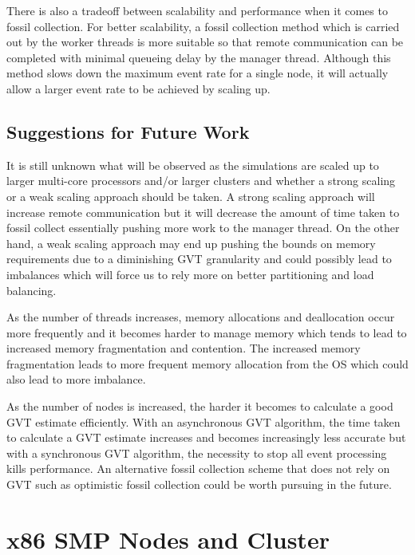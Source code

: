 \documentclass[11pt]{book}
\begin{document}
There is also a tradeoff between scalability and performance when it comes to fossil collection.
For better scalability, a fossil collection method which is carried out by the worker threads is
more suitable so that remote communication can be completed with minimal queueing delay by the
manager thread.  Although this method slows down the maximum event rate for a single node, it will
actually allow a larger event rate to be achieved by scaling up.

\section{Suggestions for Future Work}

It is still unknown what will be observed as the simulations are scaled up to larger
multi-core processors and/or larger clusters and whether a strong scaling or a weak scaling
approach should be taken.  A strong scaling approach will increase remote communication but
it will decrease the amount of time taken to fossil collect essentially pushing more work to
the manager thread.  On the other hand, a weak scaling approach may end up pushing the bounds
on memory requirements due to a diminishing GVT granularity and could possibly lead to imbalances
which will force us to rely more on better partitioning and load balancing.

As the number of threads increases, memory allocations and deallocation occur more frequently
and it becomes harder to manage memory which tends to lead to increased memory fragmentation
and contention.  The increased memory fragmentation leads to more frequent memory allocation
from the OS which could also lead to more imbalance.  

As the number of nodes is increased, the harder it becomes to calculate a good GVT estimate
efficiently.  With an asynchronous GVT algorithm, the time taken to calculate a GVT estimate
increases and becomes increasingly less accurate but with a synchronous GVT algorithm, the
necessity to stop all event processing kills performance.  An alternative fossil collection
scheme that does not rely on GVT such as optimistic fossil collection could be worth pursuing
in the future.

\appendix
\chapter{x86 SMP Nodes and Cluster}\label{x86_nodes_and_clusters}
\end{document}

